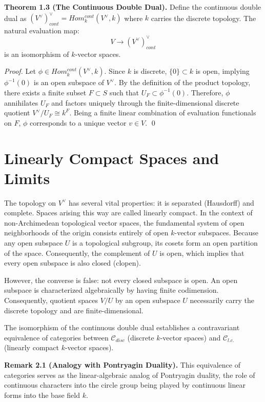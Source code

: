\documentclass[12pt]{article}
\begin{document}
\textbf{Theorem 1.3 (The Continuous Double Dual).} Define the continuous double dual as $(V^{\vee})_{cont}^{\vee}=Hom_{k}^{cont}(V^{\vee},k)$ where $k$ carries the discrete topology. The natural evaluation map:
$$V\longrightarrow(V^{\vee})_{cont}^{\vee}$$
is an isomorphism of $k$-vector spaces.

\textit{Proof.} Let $\phi\in Hom_{k}^{cont}(V^{\vee},k)$. Since $k$ is discrete, $\{0\}\subset k$ is open, implying $\phi^{-1}(0)$ is an open subspace of $V^{\vee}$. By the definition of the product topology, there exists a finite subset $F\subset S$ such that $U_{F}\subset\phi^{-1}(0)$. Therefore, $\phi$ annihilates $U_{F}$ and factors uniquely through the finite-dimensional discrete quotient $V^{\vee}/U_{F}\cong k^{F}$. Being a finite linear combination of evaluation functionals on $F$, $\phi$ corresponds to a unique vector $v\in V$. \qed

\section{Linearly Compact Spaces and Limits}

The topology on $V^{\vee}$ has several vital properties: it is separated (Hausdorff) and complete. Spaces arising this way are called linearly compact. In the context of non-Archimedean topological vector spaces, the fundamental system of open neighborhoods of the origin consists entirely of open $k$-vector subspaces. Because any open subspace $U$ is a topological subgroup, its cosets form an open partition of the space. Consequently, the complement of $U$ is open, which implies that every open subspace is also closed (clopen).

However, the converse is false: not every closed subspace is open. An open subspace is characterized algebraically by having finite codimension. Consequently, quotient spaces $V/U$ by an open subspace $U$ necessarily carry the discrete topology and are finite-dimensional.

The isomorphism of the continuous double dual establishes a contravariant equivalence of categories between $\mathcal{C}_{disc}$ (discrete $k$-vector spaces) and $\mathcal{C}_{l.c.}$ (linearly compact $k$-vector spaces).

\textbf{Remark 2.1 (Analogy with Pontryagin Duality).} This equivalence of categories serves as the linear-algebraic analog of Pontryagin duality, the role of continuous characters into the circle group being played by continuous linear forms into the base field $k$.
\end{document}
